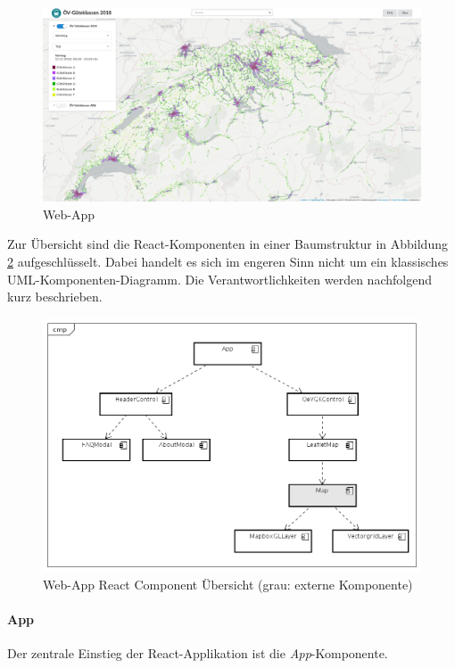 \begin{figure}[ht]
    \centering
    \includegraphics[width=1.0\linewidth]{projectdoc/img/screenshot-webapp.png}
    \caption[Web-App]{Web-App}
    \label{fig:Web_App}
\end{figure}

Zur Übersicht sind die React-Komponenten in einer Baumstruktur in Abbildung \ref{fig:Web_App_Component} aufgeschlüsselt.
Dabei handelt es sich im engeren Sinn nicht um ein klassisches UML-Komponenten-Diagramm.
Die Verantwortlichkeiten werden nachfolgend kurz beschrieben.

\begin{figure}[H]
    \centering
    \includegraphics[width=1.0\linewidth]{projectdoc/img/Web-App_Component.png}
    \caption[Web-App React Komponente Übersicht]{Web-App React Component Übersicht (grau: externe Komponente)}
    \label{fig:Web_App_Component}
\end{figure}
 
\paragraph{App}
Der zentrale Einstieg der React-Applikation ist die \emph{App}-Komponente.

